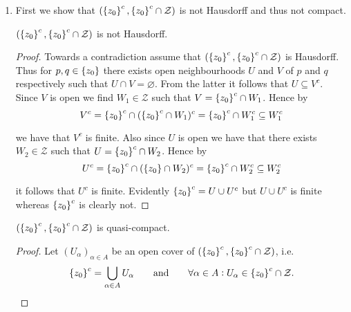 \begin{enumerate}[label = \textbf{Exercise \arabic*.},wide = 0pt, itemsep=1.5ex]
\begin{enumerate}[label = (\roman*),wide = 10pt, itemsep=1.5ex]
\begin{proof}
		Since the construction was in general, we conclude that any open cover $(U_{\alpha})_{\alpha \in A}$ has a finite subcover $(U_{\alpha_\nu})_{\nu \in \cbr[0]{0,\dots,n}}$. 
	\end{proof}
\item First we show that $(\cbr[0]{z_0}^c, \cbr[0]{z_0}^c \cap \mathcal{Z})$ is not Hausdorff and thus not compact.
			\begin{lemma}
				$(\cbr[0]{z_0}^c, \cbr[0]{z_0}^c \cap \mathcal{Z})$ is not Hausdorff.
			\end{lemma}

		\begin{proof}
			Towards a contradiction assume that $(\cbr[0]{z_0}^c, \cbr[0]{z_0}^c \cap \mathcal{Z})$ is Hausdorff. Thus for $p,q \in \cbr[0]{z_0}$ there exists open neighbourhoods $U$ and $V$ of $p$ and $q$ respectively such that $U \cap V = \varnothing$. From the latter it follows that $U \subseteq V^c$. Since $V$ is open we find $W_1 \in \mathcal{Z}$ such that $V = \cbr[0]{z_0}^c \cap W_1$. Hence by
			\begin{equation*}
				V^c = \cbr[0]{z_0}^c \cap (\cbr[0]{z_0}^c \cap W_1)^c = \cbr[0]{z_0}^c \cap W_1^c \subseteq W_1^c
			\end{equation*}

			\noindent we have that $V^c$ is finite. Also since $U$ is open we have that there exists $W_2 \in \mathcal{Z}$ such that $U = \cbr[0]{z_0}^c \cap W_2$. Hence by 
			\begin{equation*}
				U^c = \cbr[0]{z_0}^c \cap (\cbr[0]{z_0} \cap W_2)^c = \cbr[0]{z_0}^c \cap W_2^c \subseteq W_2^c
			\end{equation*}

			\noindent it follows that $U^c$ is finite. Evidently $\cbr[0]{z_0}^c = U \cup U^c$ but $U \cup U^c$ is finite whereas $\cbr[0]{z_0}^c$ is clearly not.
		\end{proof}

			\begin{lemma}
				$(\cbr[0]{z_0}^c, \cbr[0]{z_0}^c \cap \mathcal{Z})$ is quasi-compact.	
			\end{lemma}

		\begin{proof}
			Let $(U_\alpha)_{\alpha \in A}$ be an open cover of $(\cbr[0]{z_0}^c, \cbr[0]{z_0}^c \cap \mathcal{Z})$, i.e. 
				\begin{equation}
					\cbr[0]{z_0}^c = \bigcup_{\alpha \in A}U_\alpha \qquad \text{and} \qquad \forall \alpha \in A: U_\alpha \in \cbr[0]{z_0}^c \cap \mathcal{Z}.
				\end{equation}


\end{proof}
\end{enumerate}
\end{enumerate}
